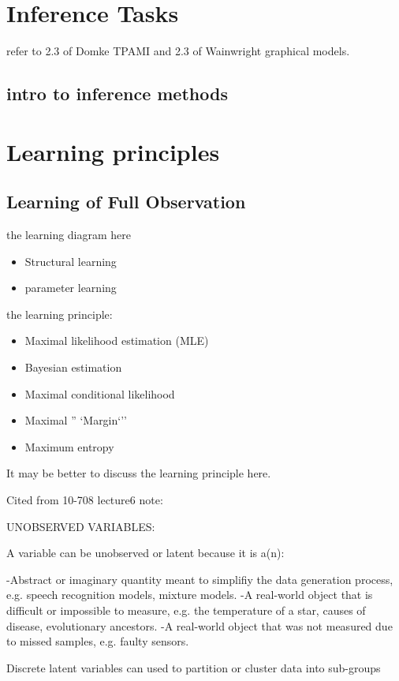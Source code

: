 \section{Inference Tasks}
\label{sec:background-graphial-reppresentation}
refer to 2.3 of Domke TPAMI and 2.3 of Wainwright graphical models.

\subsection{intro to inference methods}
\section{Learning principles}
\subsection{Learning of Full Observation}

the learning diagram here
\begin{itemize}
\item Structural learning
\item parameter learning
\end{itemize}


the learning principle:
\begin{itemize}
\item Maximal likelihood estimation (MLE)
\item Bayesian estimation
\item Maximal conditional likelihood
\item Maximal '' `Margin`''
\item Maximum entropy
\end{itemize}


It may be better to discuss the learning principle here.

Cited from 10-708 lecture6 note:

UNOBSERVED VARIABLES:

A variable can be unobserved or latent because it is a(n):

-Abstract or imaginary quantity meant to simplifiy the data generation process, e.g. speech recognition models, mixture models.
-A real-world object that is difficult or impossible to measure, e.g. the temperature of a star, causes of disease, evolutionary ancestors.
-A real-world object that was not measured due to missed samples, e.g. faulty sensors.

Discrete latent variables can used to partition or cluster data into sub-groups

